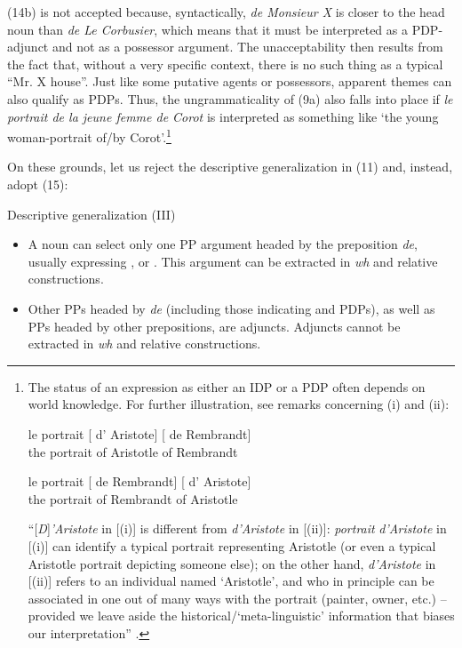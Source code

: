 \documentclass[output=paper]{langsci/langscibook}
\begin{document}
(14b) is not accepted because, syntactically, \textit{de Monsieur X} is closer to the head noun than \textit{de Le Corbusier}, which means that it must be interpreted as a PDP-adjunct and not as a possessor argument. The unacceptability then results from the fact that, without a very specific context, there is no such thing as a typical “Mr. X house”. Just like some putative agents or possessors, apparent themes can also qualify as PDPs. Thus, the ungrammaticality of (9a) also falls into place if \textit{le portrait de la jeune femme de Corot} is interpreted as something like ‘the young woman-portrait of/by Corot’.\footnote{The status of an expression as either an IDP or a PDP often depends on world knowledge. For further illustration, see  remarks concerning (i) and (ii):

\ea \gll le  portrait  [ d’  Aristote]  [ de  Rembrandt]\\
        the  portrait {} of  Aristotle {}  of  Rembrandt\\
    \z
    
\ea \gll le  portrait  [ de  Rembrandt]  [ d’  Aristote]\\
        the  portrait {} of  Rembrandt {} of  Aristotle\\
    \z
    
    \noindent“[\textit{D}]\textit{’Aristote} in [(i)] is different from \textit{d’Aristote} in [(ii)]: \textit{portrait} \textit{d’Aristot}\textit{e}\textbf{ }in [(i)] can identify a typical portrait representing Aristotle (or even a typical Aristotle portrait depicting someone else); on the other hand, \textit{d’Aristo}\textit{te} in [(ii)] refers to an individual named ‘Aristotle’, and who in principle can be associated in one out of many ways with the portrait (painter, owner, etc.) – provided we leave aside the historical/‘meta-linguistic’ information that biases our interpretation” \citep[748]{Kolliakou1999}.}

On these grounds, let us reject the descriptive generalization in (11) and, instead, adopt (15):

\begin{exe}
\ex%
    \label{ex:mensch:15}
Descriptive generalization (III)

\begin{itemize}
\item A noun can select only one PP argument headed by the preposition \textit{de}, usually expressing \AGENT, \THEME or \POSSESSOR. This argument can be extracted in \textit{wh} and relative constructions.
\item Other PPs headed by \textit{de} (including those indicating \SOURCE and \linebreak PDPs), as well as PPs headed by other prepositions, are adjuncts. Adjuncts cannot be extracted in \textit{wh} and relative constructions.
\end{itemize}
\end{exe}
\end{document}
